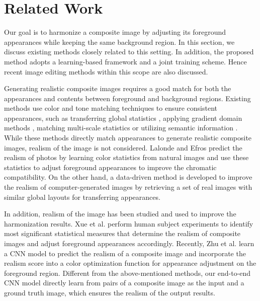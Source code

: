 \documentclass[10pt,twocolumn,letterpaper]{article}
\begin{document}
\section{Related Work}
%
Our goal is to harmonize a composite image by adjusting its foreground appearances while keeping the same background region.
%
In this section, we discuss existing methods closely related to this setting.
%
In addition, the proposed method adopts a learning-based framework and a joint training scheme. 
%
Hence recent image editing methods within this scope are also discussed.
%

{}
%
Generating realistic composite images requires a good match for both the appearances and contents between foreground and background regions.
%
Existing methods use color and tone matching techniques to ensure consistent appearances, such as transferring global statistics \cite{Reinhard_CGA_2001,Pitie_CVMP_2007}, applying gradient domain methods \cite{Perez_siggraph_2003,Tao_IJCV_2013}, matching multi-scale statistics \cite{Sunkavalli_siggraph_2010} or utilizing semantic information \cite{Tsai_SIGGRAPH_2016}.
%
While these methods directly match appearances to generate realistic composite images, realism of the image is not considered.
%
Lalonde and Efros \cite{Lalonde_ICCV_2007} predict the realism of photos by learning color statistics from natural images and use these statistics to adjust foreground appearances to improve the chromatic compatibility.
%
On the other hand, a data-driven method \cite{Johnson_TVGG_2011} is developed to improve the realism of computer-generated images by retrieving a set of real images with similar global layouts for transferring appearances.

%
In addition, realism of the image has been studied and used to improve the harmonization results.
%
Xue et al. \cite{Xue_siggraph_2012} perform human subject experiments to identify most significant statistical measures that determine the realism of composite images and adjust foreground appearances accordingly.
%
Recently, Zhu et al. \cite{Zhu_ICCV_2015} learn a CNN model to predict the realism of a composite image and incorporate the realism score into a color optimization function for appearance adjustment on the foreground region.
%
Different from the above-mentioned methods, our end-to-end CNN model directly learn from pairs of a composite image as the input and a ground truth image, which ensures the realism of the output results.  
%
\end{document}
